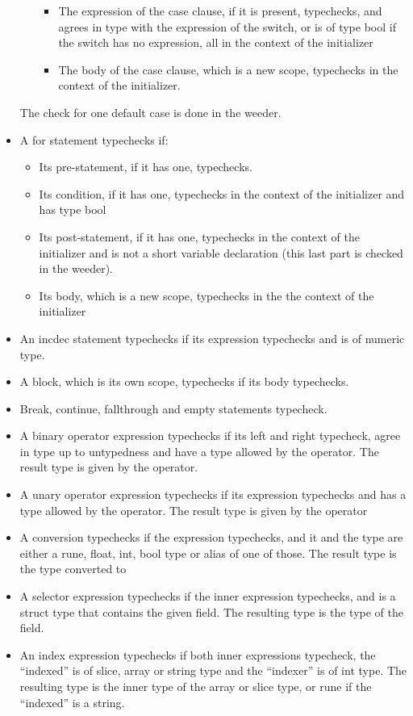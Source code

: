 \documentclass[letterpaper,11pt]{article}
\begin{document}
\begin{itemize}
\begin{itemize}
\begin{itemize}
		\item The expression of the case clause, if it is present, typechecks, and agrees in type with the expression of the switch, or is of type bool if the switch has no expression, all in the context of the initializer
		\item The body of the case clause, which is a new scope, typechecks in the context of the initializer.
		\end{itemize}
	\end{itemize}
The check for one default case is done in the weeder.
\item A for statement typechecks if:
	\begin{itemize}
	\item Its pre-statement, if it has one, typechecks.
	\item Its condition, if it has one, typechecks in the context of the initializer and has type bool
	\item Its post-statement, if it has one, typechecks in the context of the initializer and is not a short variable declaration (this last part is checked in the weeder).
	\item Its body, which is a new scope, typechecks in the the context of the initializer
	\end{itemize}
\item An incdec statement typechecks if its expression typechecks and is of numeric type.
\item A block, which is its own scope, typechecks if its body typechecks.
\item Break, continue, fallthrough and empty statements typecheck.
\item A binary operator expression typechecks if its left and right typecheck, agree in type up to untypedness and have a type allowed by the operator. The result type is given by the operator.
\item A unary operator expression typechecks if its expression typechecks and has a type allowed by the operator. The result type is given by the operator
\item A conversion typechecks if the expression typechecks, and it and the type are either a rune, float, int, bool type or alias of one of those. The result type is the type converted to
\item A selector expression typechecks if the inner expression typechecks, and is a struct type that contains the given field. The resulting type is the type of the field.
\item An index expression typechecks if both inner expressions typecheck, the ``indexed'' is of slice, array or string type and the ``indexer'' is of int type. The resulting type is the inner type of the array or slice type, or rune if the ``indexed'' is a string.

\end{itemize}
\end{document}
